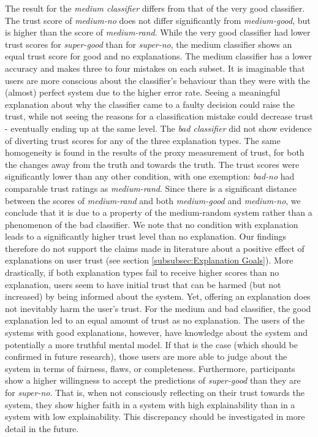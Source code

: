 The result for the \textit{medium classifier} differs from that of the very good classifier. The trust score of \textit{medium-no} does not differ significantly from \textit{medium-good}, but is higher than the score of \textit{medium-rand}. While the very good classifier had lower trust scores for \textit{super-good} than for \textit{super-no}, the medium classifier shows an equal trust score for good and no explanations. The medium classifier has a lower accuracy and makes three to four mistakes on each subset. It is imaginable that users are more conscious about the classifier's behaviour than they were with the (almost) perfect system due to the higher error rate. Seeing a meaningful explanation about why the classifier came to a faulty decision could raise the trust, while not seeing the reasons for a classification mistake could decrease trust - eventually ending up at the same level.\newline
The \textit{bad classifier} did not show evidence of diverting trust scores for any of the three explanation types. The same homogeneity is found in the results of the proxy measurement of trust, for both the changes away from the truth and towards the truth. The trust scores were significantly lower than any other condition, with one exemption: \textit{bad-no} had comparable trust ratings as \textit{medium-rand}. Since there is a significant distance between the scores of \textit{medium-rand} and both \textit{medium-good} and \textit{medium-no}, we conclude that it is due to a property of the medium-random system rather than a phenomenon of the bad classifier.\newline
We note that no condition with explanation leads to a significantly higher trust level than no explanation. Our findings therefore do not support the claims made in literature about a positive effect of explanations on user trust (see section \ref{subsubsec:Explanation Goals}). More drastically, if both explanation types fail to receive higher scores than no explanation, users seem to have initial trust that can be harmed (but not increased) by being informed about the system. Yet, offering an explanation does not inevitably harm the user's trust. For the medium and bad classifier, the good explanation led to an equal amount of trust as no explanation. The users of the systems with good explanations, however, have knowledge about the system and potentially a more truthful mental model. If that is the case (which should be confirmed in future research), those users are more able to judge about the system in terms of fairness, flaws, or completeness. Furthermore, participants show a higher willingness to accept the predictions of \textit{super-good} than they are for \textit{super-no}. That is, when not consciously reflecting on their trust towards the system, they show higher faith in a system with high explainability than in a system with low explainability. This discrepancy should be investigated in more detail in the future.\newline
